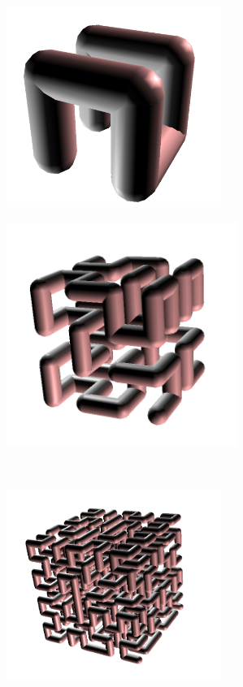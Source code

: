 \begin{center}
\begin{minipage}{7cm}
 \includegraphics[width=7cm]{pics/linden-hilbert1.png}
\end{minipage}
\begin{minipage}{7cm}
 \includegraphics[width=7.5cm]{pics/linden-hilbert2.png}
\end{minipage}\\
\begin{minipage}{7cm}
 \includegraphics[width=7cm]{pics/linden-hilbert3.png}
\end{minipage}
\begin{minipage}{7cm}

\end{minipage}
\end{center}
